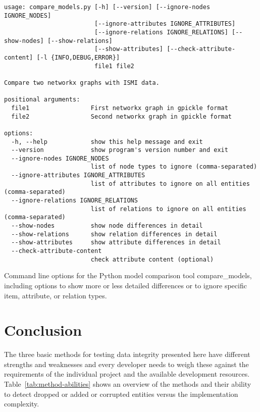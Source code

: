 \documentclass[final]{anthology-ch} %
\begin{document}
\begin{listing}
\begin{verbatim}
usage: compare_models.py [-h] [--version] [--ignore-nodes IGNORE_NODES]
                         [--ignore-attributes IGNORE_ATTRIBUTES]
                         [--ignore-relations IGNORE_RELATIONS] [--show-nodes] [--show-relations]
                         [--show-attributes] [--check-attribute-content] [-l {INFO,DEBUG,ERROR}]
                         file1 file2

Compare two networkx graphs with ISMI data.

positional arguments:
  file1                 First networkx graph in gpickle format
  file2                 Second networkx graph in gpickle format

options:
  -h, --help            show this help message and exit
  --version             show program's version number and exit
  --ignore-nodes IGNORE_NODES
                        list of node types to ignore (comma-separated)
  --ignore-attributes IGNORE_ATTRIBUTES
                        list of attributes to ignore on all entities (comma-separated)
  --ignore-relations IGNORE_RELATIONS
                        list of relations to ignore on all entities (comma-separated)
  --show-nodes          show node differences in detail
  --show-relations      show relation differences in detail
  --show-attributes     show attribute differences in detail
  --check-attribute-content
                        check attribute content (optional)
\end{verbatim}
  \caption{Command line options for the Python model comparison tool compare\_models, including options to show more or less detailed differences or to ignore specific item, attribute, or relation types.}
  \label{code:ismi-compare}
\end{listing}


\section{Conclusion}

The three basic methods for testing data integrity presented here have different strengths and weaknesses and every developer needs to weigh these against the requirements of the individual project and the available development resources. Table~\ref{tab:method-abilities} shows an overview of the methods and their ability to detect dropped or added or corrupted entities versus the implementation complexity.
\end{document}
